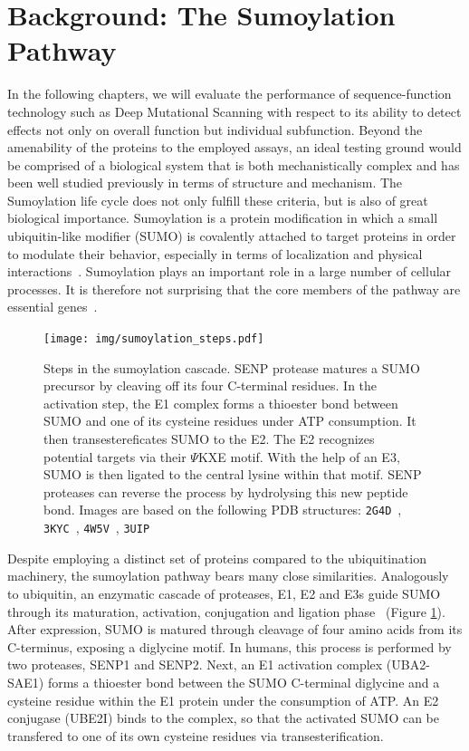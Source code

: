 \section{Background: The Sumoylation Pathway}
\label{intro:sumoylation}

In the following chapters, we will evaluate the performance of sequence-function technology such as Deep Mutational Scanning with respect to its ability to detect effects not only on overall function but individual subfunction. Beyond the amenability of the proteins to the employed assays, an ideal testing ground would be comprised of a biological system that is both mechanistically complex and has been well studied previously in terms of structure and mechanism. The Sumoylation life cycle does not only fulfill these criteria, but is also of great biological importance. Sumoylation is a protein modification in which a small ubiquitin-like modifier (SUMO) is covalently attached to target proteins in order to modulate their behavior, especially in terms of localization and physical interactions~\cite{sumoylation}. Sumoylation plays an important role in a large number of cellular processes. It is therefore not surprising that the core members of the pathway are essential genes~.

\begin{figure}
	\centering
	\texttt{[image: img/sumoylation\_steps.pdf]}
	\caption{Steps in the sumoylation cascade. SENP protease matures a SUMO precursor by cleaving off its four C-terminal residues. In the activation step, the E1 complex forms a thioester bond  between SUMO and one of its cysteine residues under ATP consumption. It then transestereficates SUMO to the E2. The E2 recognizes potential targets via their $\Psi$KXE motif. With the help of an E3, SUMO is then ligated to the central lysine within that motif. SENP proteases can reverse the process by hydrolysing this new peptide bond. Images are based on the following PDB structures: \texttt{2G4D}~\cite{Xu2006}, \texttt{3KYC}~\cite{Olsen2010}, \texttt{4W5V}~\cite{ReiterEtAl}, \texttt{3UIP}~\cite{Gareau2012}}
	\label{fig:sumoylation_steps}
\end{figure}

Despite employing a distinct set of proteins compared to the ubiquitination machinery, the sumoylation pathway bears many close similarities. Analogously to ubiquitin, an enzymatic cascade of proteases, E1, E2 and E3s guide SUMO through its maturation, activation, conjugation and ligation phase~\cite{sumoylation} (Figure \ref{fig:sumoylation_steps}). After expression, SUMO is matured through cleavage of four amino acids from its C-terminus, exposing a diglycine motif. In humans, this process is performed by two proteases, SENP1 and SENP2. Next, an E1 activation complex (UBA2-SAE1) forms a thioester bond between the SUMO C-terminal diglycine and a cysteine residue within the E1 protein under the consumption of ATP. An E2 conjugase (UBE2I) binds to the complex, so that the activated SUMO can be transfered to one of its own cysteine residues via transesterification. 

